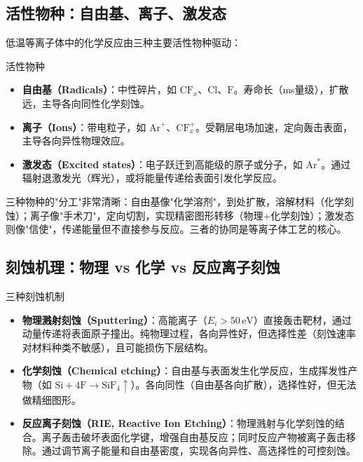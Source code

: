 \documentclass[12pt,a4paper,openany,oneside]{book}
\begin{document}
\subsection{活性物种：自由基、离子、激发态}

低温等离子体中的化学反应由三种主要活性物种驱动：

\begin{definition}{活性物种}{}{}
\label{def:active-species}
\begin{itemize}
\item \textbf{自由基（Radicals）}：中性碎片，如 $\mathrm{CF}_x$、$\mathrm{Cl}$、$\mathrm{F}$。寿命长（ms量级），扩散远，主导各向同性化学刻蚀。
\item \textbf{离子（Ions）}：带电粒子，如 $\mathrm{Ar}^+$、$\mathrm{CF}_x^+$。受鞘层电场加速，定向轰击表面，主导各向异性物理效应。
\item \textbf{激发态（Excited states）}：电子跃迁到高能级的原子或分子，如 $\mathrm{Ar}^*$。通过辐射退激发光（辉光），或将能量传递给表面引发化学反应。
\end{itemize}
\end{definition}

\begin{insight}{}{}
三种物种的"分工"非常清晰：自由基像"化学溶剂"，到处扩散，溶解材料（化学刻蚀）；离子像"手术刀"，定向切割，实现精密图形转移（物理+化学刻蚀）；激发态则像"信使"，传递能量但不直接参与反应。三者的协同是等离子体工艺的核心。
\end{insight}

\subsection{刻蚀机理：物理 vs 化学 vs 反应离子刻蚀}

\begin{definition}{三种刻蚀机制}{}{}
\label{def:etching-mechanisms}
\begin{itemize}
\item \textbf{物理溅射刻蚀（Sputtering）}：高能离子（$E_i > 50\,\mathrm{eV}$）直接轰击靶材，通过动量传递将表面原子撞出。纯物理过程，各向异性好，但选择性差（刻蚀速率对材料种类不敏感），且可能损伤下层结构。
\item \textbf{化学刻蚀（Chemical etching）}：自由基与表面发生化学反应，生成挥发性产物（如 $\mathrm{Si} + 4\mathrm{F} \to \mathrm{SiF}_4\uparrow$）。各向同性（自由基各向扩散），选择性好，但无法做精细图形。
\item \textbf{反应离子刻蚀（RIE, Reactive Ion Etching）}：物理溅射与化学刻蚀的结合。离子轰击破坏表面化学键，增强自由基反应；同时反应产物被离子轰击移除。通过调节离子能量和自由基密度，实现各向异性、高选择性的可控刻蚀。
\end{itemize}
\end{definition}
\end{document}
